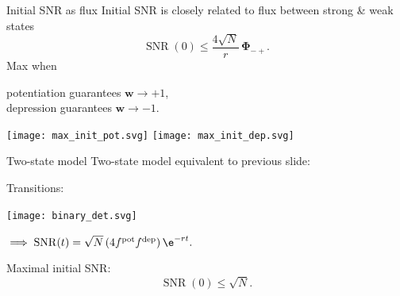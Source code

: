 \documentclass[final]{beamer}%
\DeclareMathOperator{\SNR}{SNR}
\DeclareMathOperator{\snr}{SNR}
\newcommand{\w}{\mathbf{w}}
\newcommand{\F}{\boldsymbol{\Phi}}
\newcommand{\pot}{^{\text{pot}}}
\newcommand{\dep}{^{\text{dep}}}
\begin{document}

\begin{frame}{Initial SNR as flux}
%
 Initial SNR is closely related to flux between strong \& weak states
 \begin{equation*}
   \SNR(0) \leq \frac{4\sqrt{N}}{r}\,\F_{-+}.
 \end{equation*}
 Max when {\parbox[t]{8cm}{potentiation guarantees $\w\to+1$,\\
 depression guarantees $\w\to-1$.}}
 \begin{center}
   \texttt{[image: max\_init\_pot.svg]}
   \hp \hp
   \texttt{[image: max\_init\_dep.svg]}
 \end{center}
%
\end{frame}


\begin{frame}{Two-state model}
%
 Two-state model equivalent to previous slide:
  \begin{center}
  Transitions:
   \parbox{2cm}{\texttt{[image: binary\_det.svg]}}
   $\implies\snr(t)=\sqrt{N}\,(4 f\pot f\dep)\,\e^{-rt}.$
  \end{center}

 \vp Maximal initial SNR:\note[item]{$f\pot=\half$}
 \begin{equation*}
   \snr(0) \leq \sqrt{N}.
 \end{equation*}
%
\end{frame}

\end{document}
